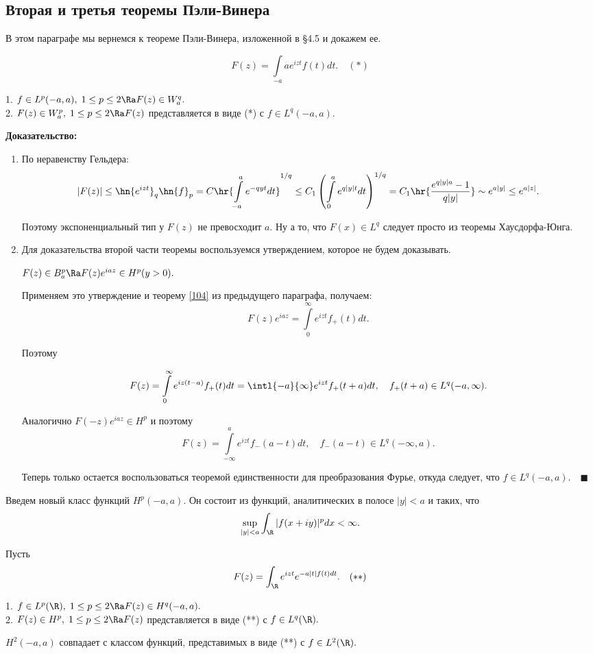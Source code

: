 \documentclass[a4paper]{article}
\begin{document}
\subsection{Вторая и третья теоремы Пэли-Винера}
В этом параграфе мы вернемся к теореме Пэли-Винера, изложенной в \S4.5 и докажем ее.

$$F(z)=\int\limits_{-a}a e^{izt}f(t)dt.\quad(*)$$

\begin{theorems}
1. $f\in L^p(-a,a),\;1\le p \le2\Ra F(z)\in W^q_a.$ \\\hangindent=2.5cm 2. $F(z)\in W^p_a,\;1\le
p\le2\Ra F(z)$ представляется в виде (*) с $f\in L^q(-a,a).$
\end{theorems}
\textbf{Доказательство:}
\begin{enumerate}
\item
По неравенству Гельдера:
$$|F(z)|\le\hn{e^{izt}}_q\hn{f}_p=C\hr{\int\limits_{-a}^a e^{-qyt}dt}^{1/q}\le C_1\left(\int\limits_0^a
e^{q|y|t}dt\right)^{1/q}=C_1\hr{\frac{e^{q|y|a}-1}{q|y|}}\sim e^{a|y|}\le e^{a|z|}.$$

Поэтому экспоненциальный тип у $F(z)$ не превосходит $a.$ Ну а то, что $F(x)\in L^q$ следует просто из
теоремы Хаусдорфа-Юнга.
\item
Для доказательства второй части теоремы воспользуемся утверждением, которое не будем доказывать.

\begin{utv}
$F(z)\in B^p_a\Ra F(z)e^{iaz}\in H^p (y>0).$
\end{utv}

Применяем это утверждение и теорему \ref{104} из предыдущего параграфа, получаем:
$$F(z)e^{iaz}=\int\limits_0^{\infty}e^{izt}f_+(t)dt.$$

Поэтому

$$F(z)=\int\limits_0^{\infty}e^{iz(t-a)}f_+(t)dt=\intl{-a}{\infty}e^{izt}f_+(t+a)dt,\quad f_+(t+a)\in L^q(-a,\infty).$$

Аналогично $F(-z)e^{iaz}\in H^p$ и поэтому
$$F(z)=\int\limits_{-\infty}^a e^{izt}f_-(a-t)dt,\quad f_-(a-t)\in L^q(-\infty,a).$$

Теперь только остается воспользоваться теоремой единственности для преобразования Фурье, откуда следует, что
$f\in L^q(-a,a).\quad\blacksquare$
\end{enumerate}
Введем новый класс функций $H^p(-a,a)$. Он состоит из функций, аналитических в полосе $|y|<a$ и таких, что
$$\sup_{|y|<a}\int_{\R }|f(x+iy)|^pdx<\infty.$$

Пусть
$$F(z)=\int_{\R }e^{izt}e^{-a|t|f(t)dt}.\quad(**)$$

\begin{theorems}
1. $f\in L^p(\R ),\;1\le p\le2\Ra F(z)\in H^q(-a,a).$\\\hangindent=2.5cm 2. $F(z)\in
H^p,\;1\le p\le2\Ra F(z)$ представляется в виде (**) с $f\in L^q(\R ).$
\end{theorems}

\begin{theorems}
$H^2(-a,a)$ совпадает с классом функций, представимых в виде (**) с $f\in L^2(\R).$
\end{theorems}
\end{document}
